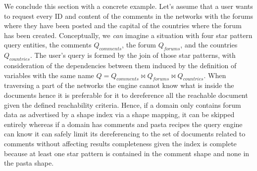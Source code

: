We conclude this section with a concrete example.
Let's assume that a user wants to request every ID and content of the comments in the networks with the forums where they have been posted and the capital of the countries where the forum has been created.
Conceptually, we \emph{can} imagine a situation with four star pattern query entities, the comments $ Q_{comments}$, the forum $Q_{forums}$, and the countries $Q_{countries}$.
The user's query is formed by the join of those star patterns, with consideration of the dependencies between them induced by the definition of variables with the same name $Q = Q_{comments} \bowtie Q_{forums} \bowtie Q_{countries}$. 
When traversing a part of the networks the engine cannot know what is inside the documents hence it is preferable for it to dereference all the reachable document given the defined reachability criteria.
Hence, if a domain only contains forum data as advertised by a shape index via a shape mapping, it can be skipped entirely 
whereas if a domain has comments and pasta recipes the query engine can know it can safely limit its dereferencing to the set of documents related to comments without affecting results completeness given the index is complete
because at least one star pattern is contained in the comment shape and none in the pasta shape.
